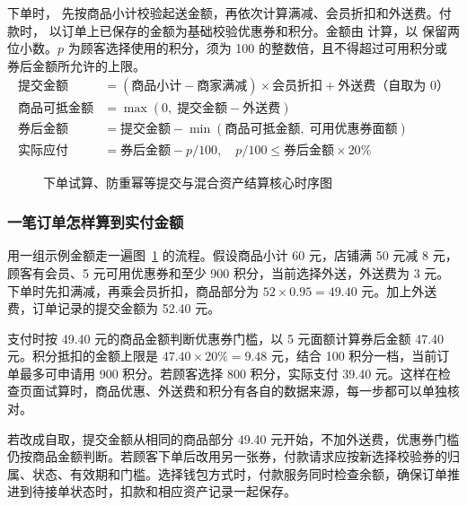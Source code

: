 下单时， 先按商品小计校验起送金额，再依次计算满减、会员折扣和外送费。付款时， 以订单上已保存的金额为基础校验优惠券和积分。金额由  计算，以  保留两位小数。\(\mathit{p}\) 为顾客选择使用的积分，须为 100 的整数倍，且不得超过可用积分或券后金额所允许的上限。
\begin{align}
  \text{提交金额} &= (\text{商品小计} - \text{商家满减}) \times \text{会员折扣} + \text{外送费（自取为 0）} \\
  \text{商品可抵金额} &= \max(0,\; \text{提交金额} - \text{外送费}) \\
  \text{券后金额} &= \text{提交金额} - \min(\text{商品可抵金额},\; \text{可用优惠券面额}) \\
  \text{实际应付} &= \text{券后金额} - \mathit{p}/100,\quad \mathit{p}/100 \leq \text{券后金额}\times 20\%
\end{align}

\begin{figure}[!htbp]
  \centering
  \resizebox{!}{.46\textheight}{}
  \caption{下单试算、防重幂等提交与混合资产结算核心时序图}\label{fig:def-settlement-seq}
\end{figure}

\subsubsection{一笔订单怎样算到实付金额}

用一组示例金额走一遍图~\ref{fig:def-settlement-seq} 的流程。假设商品小计 60 元，店铺满 50 元减 8 元，顾客有会员、5 元可用优惠券和至少 900 积分，当前选择外送，外送费为 3 元。下单时先扣满减，再乘会员折扣，商品部分为 \(52\times 0.95=49.40\) 元。加上外送费，订单记录的提交金额为 52.40 元。

支付时按 49.40 元的商品金额判断优惠券门槛，以 5 元面额计算券后金额 47.40 元。积分抵扣的金额上限是 \(47.40\times 20\%=9.48\) 元，结合 100 积分一档，当前订单最多可申请用 900 积分。若顾客选择 800 积分，实际支付 39.40 元。这样在检查页面试算时，商品优惠、外送费和积分有各自的数据来源，每一步都可以单独核对。

若改成自取，提交金额从相同的商品部分 49.40 元开始，不加外送费，优惠券门槛仍按商品金额判断。若顾客下单后改用另一张券，付款请求应按新选择校验券的归属、状态、有效期和门槛。选择钱包方式时，付款服务同时检查余额，确保订单推进到待接单状态时，扣款和相应资产记录一起保存。

